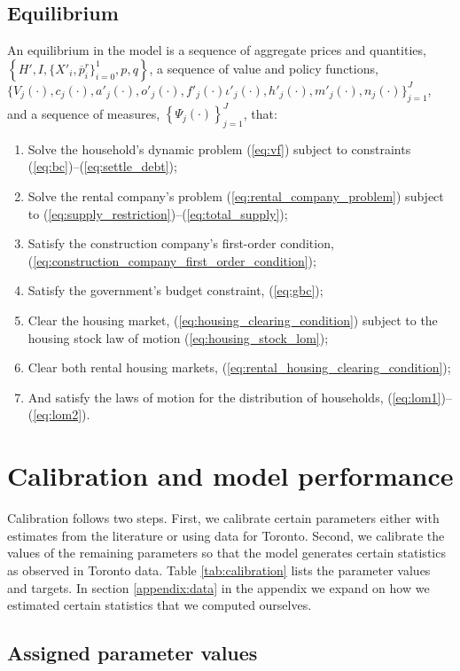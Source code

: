 \documentclass[parskip=full]{article}
\begin{document}
\subsection{Equilibrium}
An equilibrium in the model is a sequence of aggregate prices and quantities, $\left\{H',I,\{X'_{i},\overline{p}^{r}_{i}\}^{1}_{i=0},p,q\right\}$, a sequence of value and policy functions, $\biggl\{V_{j}(\cdot),c_{j}(\cdot),a'_{j}(\cdot),o'_{j}(\cdot),f'_{j}(\cdot)\iota'_{j}(\cdot),h'_{j}(\cdot),m'_{j}(\cdot),n_{j}(\cdot)\biggl\}_{j=1}^J$, and a sequence of measures, $\left\{\Psi_{j}(\cdot)\right\}_{j=1}^J$, that:
\begin{enumerate}
\item Solve the household's dynamic problem (\ref{eq:vf}) subject to constraints (\ref{eq:bc})--(\ref{eq:settle_debt});
\item Solve the rental company's problem (\ref{eq:rental_company_problem}) subject to (\ref{eq:supply_restriction})--(\ref{eq:total_supply});
\item Satisfy the construction company's first-order condition, (\ref{eq:construction_company_first_order_condition});
\item Satisfy the government's budget constraint, (\ref{eq:gbc});
\item Clear the housing market,
(\ref{eq:housing_clearing_condition}) subject to the housing stock law of motion (\ref{eq:housing_stock_lom});
\item Clear both rental housing markets,
(\ref{eq:rental_housing_clearing_condition});
\item And satisfy the laws of motion for the distribution of households, (\ref{eq:lom1})--(\ref{eq:lom2}).
\end{enumerate}

\section{Calibration and model performance}\label{sec:calibration}

Calibration follows two steps. First, we calibrate certain parameters either with estimates from the literature or using data for Toronto. Second, we calibrate the values of the remaining parameters so that the model generates certain statistics as observed in Toronto data. Table \ref{tab:calibration} lists the parameter values and targets. In section \ref{appendix:data} in the appendix we expand on how we estimated certain statistics that we computed ourselves.

\subsection{Assigned parameter values}
\end{document}
